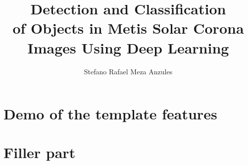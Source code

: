 \documentclass{unipd-thesis-modern} %
\title{Detection and Classification \\ of Objects in Metis Solar Corona
Images Using Deep Learning}
\author{Stefano Rafael Meza Anzules}
\begin{document}
    \frontmatter

    \mainmatter

    
    \glsresetall  %

    \part{\label{prt:demo}Demo of the template features} %

    


    \part{\label{prt:filler}Filler part}
    
    

    

    
    \begin{appendices}
        
    \end{appendices}

    \backmatter
\end{document}
